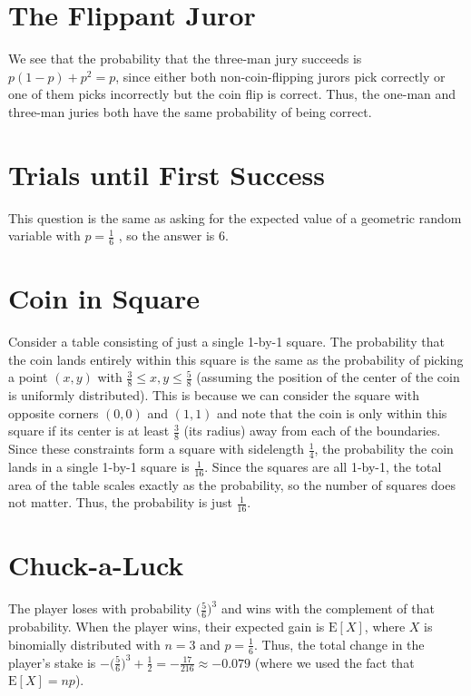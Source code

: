 \documentclass{article}
\begin{document}
\section{The Flippant Juror}
We see that the probability that the three-man jury succeeds is $p(1-p) + p^2 = p$, since either both 
non-coin-flipping jurors pick correctly or one of them picks incorrectly but the coin flip is correct.
Thus, the one-man and three-man juries both have the same probability of being correct.

\section{Trials until First Success}
This question is the same as asking for the expected value of a geometric random variable with $p = \frac{1}{6}$
, so the answer is 6.

\section{Coin in Square}
Consider a table consisting of just a single 1-by-1 square. The probability that the coin lands entirely within
this square is the same as  the probability of picking a point $(x, y)$ with $\frac{3}{8} \leq x, y \leq
\frac{5}{8}$ (assuming the position of the center of the coin is uniformly distributed). 
This is because we can consider the square with opposite corners $(0, 0)$ and $(1, 1)$ and note
that the coin is only within this square if its center is at least $\frac{3}{8}$ (its radius) away from each
of the boundaries. Since these constraints form a square with sidelength $\frac{1}{4}$, the probability the
coin lands in a single 1-by-1 square is $\frac{1}{16}$. Since the squares are all 1-by-1, the total area of the
table scales exactly as the probability, so the number of squares does not matter. Thus, the probability
is just $\frac{1}{16}$.

\section{Chuck-a-Luck}
The player loses with probability $\bigg(\frac{5}{6}\bigg)^3$ and wins with the complement of that probability.
When the player wins, their expected gain is $ \mathrm{E} [X] $, where $X$ is binomially distributed with
$n = 3$ and $p = \frac{1}{6}$. Thus, the total change in the player's stake is $-\bigg(\frac{5}{6}\bigg)^3 + \frac{1}{2} = -\frac{17}{216} \approx -0.079$ (where we used the fact that $\mathrm{E} [X] = np$).
\end{document}
